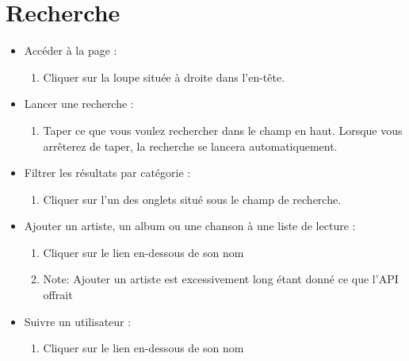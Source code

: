 \documentclass[12pt, letterpaper]{article}
\begin{document}
    \section*{Recherche}
    \begin{itemize}
        \item Accéder à la page :
        \begin{enumerate}
            \item Cliquer sur la loupe située à droite dans l'en-tête.
        \end{enumerate}

        \item Lancer une recherche :
        \begin{enumerate}
            \item Taper ce que vous voulez rechercher dans le champ en haut. Lorsque vous arrêterez de taper, la recherche se lancera automatiquement.
        \end{enumerate}

        \item Filtrer les résultats par catégorie :
        \begin{enumerate}
            \item Cliquer sur l'un des onglets situé sous le champ de recherche.
        \end{enumerate}

        \item Ajouter un artiste, un album ou une chanson à une liste de lecture :
        \begin{enumerate}
            \item Cliquer sur le lien en-dessous de son nom
            \item Note: Ajouter un artiste est excessivement long étant donné ce que l'API offrait
        \end{enumerate}

        \item Suivre un utilisateur :
        \begin{enumerate}
            \item Cliquer sur le lien en-dessous de son nom
        \end{enumerate}
    \end{itemize}
\end{document}
